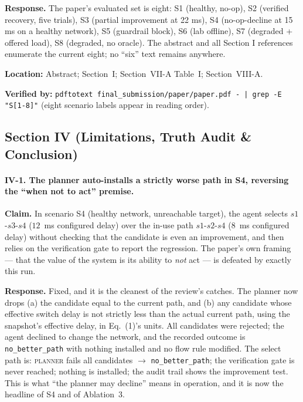 \documentclass[11pt,a4paper]{article}
\begin{document}
\textbf{Response.} The paper's evaluated set is eight: S1 (healthy, no-op),
S2 (verified recovery, five trials), S3 (partial improvement at 22 ms),
S4 (no-op-decline at 15 ms on a healthy network), S5 (guardrail block),
S6 (lab offline), S7 (degraded + offered load), S8 (degraded, no oracle).
The abstract and all Section I references enumerate the current eight; no
``six'' text remains anywhere.

\textbf{Location:} Abstract; Section~I; Section~VII-A Table~I; Section~VIII-A.

\textbf{Verified by:} \texttt{pdftotext final\_submission/paper/paper.pdf - | grep -E "S[1-8]"}
(eight scenario labels appear in reading order).

\subsection{Section IV (Limitations, Truth Audit \& Conclusion)}

\paragraph{IV-1. The planner auto-installs a strictly worse path in S4,
reversing the ``when not to act'' premise.}

\textbf{Claim.} In scenario S4 (healthy network, unreachable target), the
agent selects $s1$-$s3$-$s4$ ($12$~ms configured delay) over the
in-use path $s1$-$s2$-$s4$ ($8$~ms configured delay) without checking that the
candidate is even an improvement, and then relies on the verification gate to
report the regression. The paper's own framing --- that the value of the
system is its ability to \emph{not} act --- is defeated by exactly this run.

\textbf{Response.} Fixed, and it is the cleanest of the review's catches.
The planner now drops (a) the candidate equal to the current path, and
(b) any candidate whose effective switch delay is not strictly less than the
actual current path, using the snapshot's effective delay, in Eq.~(1)'s units.
All candidates were rejected; the agent declined to change the network, and
the recorded outcome is \texttt{no\_better\_path} with nothing installed and
no flow rule modified. The select path is: \textsc{planner} fails all
candidates $\to$ \texttt{no\_better\_path}; the verification gate is never
reached; nothing is installed; the audit trail shows the improvement test.
This is what ``the planner may decline'' means in operation, and it is now
the headline of S4 and of Ablation~3.
\end{document}
